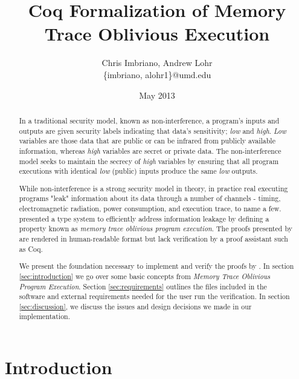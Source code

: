 \documentclass[10pt,  onecolumn]{article}
\begin{document}
\title{Coq Formalization of Memory Trace Oblivious Execution}
\author{ Chris Imbriano, Andrew Lohr \\
\{imbriano,  alohr1\}@umd.edu }
\date{May 2013}

\maketitle



\begin{abstract}
In a traditional security model, known as non-interference, a program's inputs and outputs are given security labels indicating that data's sensitivity; \emph{low} and \emph{high}.
\emph{Low} variables are those data that are public or can be infrared from publicly available information, whereas \emph{high} variables are secret or private data.
The non-interference model seeks to maintain the secrecy of \emph{high} variables by ensuring that all program executions with identical \emph{low} (public) inputs produce the same \emph{low} outputs.

While non-interference is a strong security model in theory, in practice real executing programs "leak" information about its data through a number of channels - timing, electromagnetic radiation, power consumption, and execution trace, to name a few.
\citeauthor{mtope} presented a type system to efficiently address information leakage by defining a property known as \emph{memory trace oblivious program execution}.
The proofs presented by \citeauthor{mtope} are rendered in human-readable format but lack verification by a proof assistant such as Coq.

We present the foundation necessary to implement and verify the proofs by \citeauthor{mtope}.
In section \ref{sec:introduction} we go over some basic concepts from \emph{Memory Trace Oblivious Program Execution}.\cite{mtope}
Section \ref{sec:requirements} outlines the files included in the software and external requirements needed for the user run the verification.
In section \ref{sec:discussion}, we discuss the issues and design decisions we made in our implementation.


\end{abstract}

\section{Introduction}
\label{sec:introduction}
\end{document}
